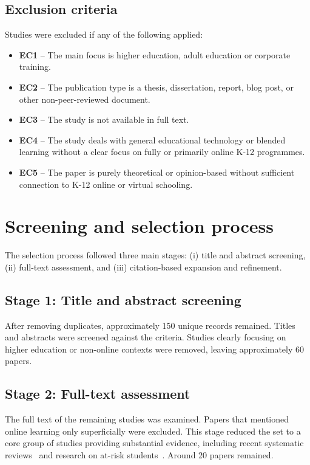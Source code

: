 \subsection{Exclusion criteria}
Studies were excluded if any of the following applied:
\begin{itemize}
    \item \textbf{EC1} -- The main focus is higher education, adult education or corporate training.
    \item \textbf{EC2} -- The publication type is a thesis, dissertation, report, blog post, or other non-peer-reviewed document.
    \item \textbf{EC3} -- The study is not available in full text.
    \item \textbf{EC4} -- The study deals with general educational technology or blended learning without a clear focus on fully or primarily online K-12 programmes.
    \item \textbf{EC5} -- The paper is purely theoretical or opinion-based without sufficient connection to K-12 online or virtual schooling.
\end{itemize}

\section{Screening and selection process}
The selection process followed three main stages: (i) title and abstract screening, (ii) full-text assessment, and (iii) citation-based expansion and refinement.

\subsection{Stage 1: Title and abstract screening}
After removing duplicates, approximately 150 unique records remained. Titles and abstracts were screened against the criteria. Studies clearly focusing on higher education or non-online contexts were removed, leaving approximately 60 papers.

\subsection{Stage 2: Full-text assessment}
The full text of the remaining studies was examined. Papers that mentioned online learning only superficially were excluded. This stage reduced the set to a core group of studies providing substantial evidence, including recent systematic reviews~\cite{martin_systematic_2020,online_johnson_2022} and research on at-risk students~\cite{beck_atrisk_2024,beck_advocate_2020}. Around 20 papers remained.

